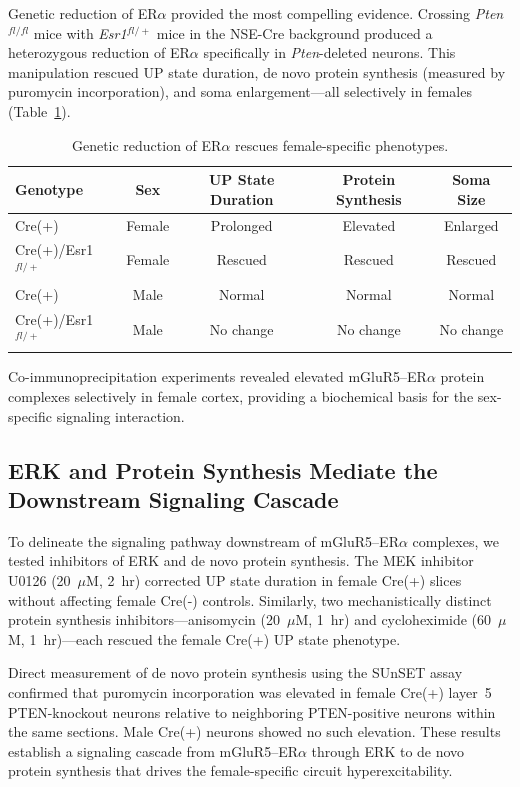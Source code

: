 \documentclass[11pt]{article}
\begin{document}
Genetic reduction of ER$\alpha$ provided the most compelling evidence. Crossing \textit{Pten}$^{fl/fl}$ mice with \textit{Esr1}$^{fl/+}$ mice in the NSE-Cre background produced a heterozygous reduction of ER$\alpha$ specifically in \textit{Pten}-deleted neurons. This manipulation rescued UP state duration, de novo protein synthesis (measured by puromycin incorporation), and soma enlargement---all selectively in females (Table~\ref{tab:eralpha}).

\begin{table}[htbp]
\centering
\caption{Genetic reduction of ER$\alpha$ rescues female-specific phenotypes.}
\label{tab:eralpha}
\begin{tabular}{lcccc}
\toprule
Genotype & Sex & UP State Duration & Protein Synthesis & Soma Size \\
\midrule
Cre(+) & Female & Prolonged & Elevated & Enlarged \\
Cre(+)/Esr1$^{fl/+}$ & Female & Rescued & Rescued & Rescued \\
Cre(+) & Male & Normal & Normal & Normal \\
Cre(+)/Esr1$^{fl/+}$ & Male & No change & No change & No change \\
\bottomrule
\end{tabular}
\end{table}

Co-immunoprecipitation experiments revealed elevated mGluR5--ER$\alpha$ protein complexes selectively in female cortex, providing a biochemical basis for the sex-specific signaling interaction.

\subsection{ERK and Protein Synthesis Mediate the Downstream Signaling Cascade}

To delineate the signaling pathway downstream of mGluR5--ER$\alpha$ complexes, we tested inhibitors of ERK and de novo protein synthesis. The MEK inhibitor U0126 (20~$\mu$M, 2~hr) corrected UP state duration in female Cre(+) slices without affecting female Cre(-) controls. Similarly, two mechanistically distinct protein synthesis inhibitors---anisomycin (20~$\mu$M, 1~hr) and cycloheximide (60~$\mu$M, 1~hr)---each rescued the female Cre(+) UP state phenotype.

Direct measurement of de novo protein synthesis using the SUnSET assay confirmed that puromycin incorporation was elevated in female Cre(+) layer~5 PTEN-knockout neurons relative to neighboring PTEN-positive neurons within the same sections. Male Cre(+) neurons showed no such elevation. These results establish a signaling cascade from mGluR5--ER$\alpha$ through ERK to de novo protein synthesis that drives the female-specific circuit hyperexcitability.
\end{document}
